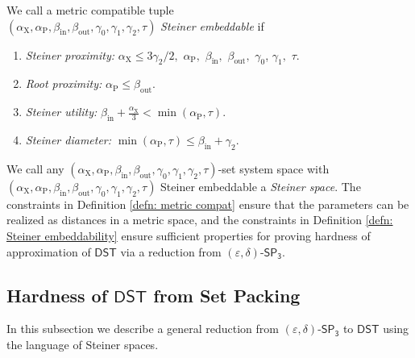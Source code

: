 \documentclass{theoretics}
\newcommand{\1}{\textbf{1}}
\newcommand{\setpT}{$\mathsf{SP_3}$\xspace}
\newcommand{\dst}{$\mathsf{DST}$\xspace}
\newcommand{\td}{\tau}
\newcommand{\srd}{\alpha_{\text{X}}}
\newcommand{\trd}{\alpha_{\text{P}}}
\begin{document}
\begin{definition} \label{defn: Steiner embeddability}
We call a metric compatible tuple \\ $(\srd, \trd, \beta_{\text{in}}, \beta_{\text{out}}, \gamma_0, \gamma_1, \gamma_2, \td)$ \textit{Steiner embeddable} if 
\begin{enumerate}[label=(P\arabic*)]
\item \textit{Steiner proximity:} $\srd \leq 3\gamma_2/2,$ $\trd,$ $\beta_{\text{in}},$ $\beta_{\text{out}},$ $\gamma_0$, $\gamma_1,$ $\td$. \label{cond: sr prox}
    \item \textit{Root proximity:} $\trd \leq \beta_{\text{out}}.$  \label{cond: res s adj}
    \item \textit{Steiner utility:} $\beta_{\text{in}} + \frac{\srd}{3} < \min(\trd, \td)$.  \label{cond: s util}
    \item \textit{Steiner diameter:} $\min(\trd, \td) \leq \beta_{\text{in}} + \gamma_2$.  \label{cond: ss' non adj}
\end{enumerate}


We call any $(\srd, \trd, \beta_{\text{in}}, \beta_{\text{out}}, \gamma_0, \gamma_1, \gamma_2, \td)$-set system space with $(\srd, \trd, \beta_{\text{in}}, \beta_{\text{out}}, \gamma_0, \gamma_1, \gamma_2, \td)$ Steiner embeddable a \textit{Steiner space}.  The constraints in Definition \ref{defn: metric compat} ensure that the parameters can be realized as distances in a metric space, and the constraints in Definition \ref{defn: Steiner embeddability} ensure sufficient properties for proving hardness of approximation of \dst via a reduction from $(\varepsilon, \delta)$-\setpT.
\end{definition}





\subsection{Hardness of \texorpdfstring{\dst}{DST} from Set Packing} \label{subsec: gap preserving red metric st}

 In this subsection we describe a general reduction from $(\varepsilon,\delta)$-\setpT to \dst using the language of Steiner spaces.
\end{document}

